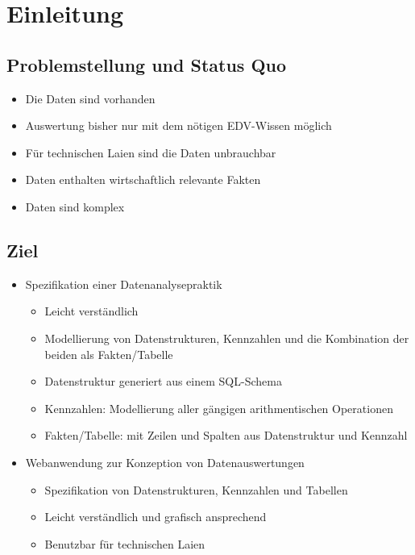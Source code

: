 \chapter{Einleitung}

\section{Problemstellung und Status Quo}
\begin{itemize}
  \item Die Daten sind vorhanden
  \item Auswertung bisher nur mit dem nötigen EDV-Wissen möglich
  \item Für technischen Laien sind die Daten unbrauchbar
  \item Daten enthalten wirtschaftlich relevante Fakten
  \item Daten sind komplex
\end{itemize}

\section{Ziel}
\begin{itemize}
\item Spezifikation einer Datenanalysepraktik
  \begin{itemize}
    \item Leicht verständlich
    \item Modellierung von Datenstrukturen, Kennzahlen und die Kombination der beiden als Fakten/Tabelle
    \item Datenstruktur generiert aus einem SQL-Schema
    \item Kennzahlen: Modellierung aller gängigen arithmentischen Operationen
    \item Fakten/Tabelle: mit Zeilen und Spalten aus Datenstruktur und Kennzahl 
  \end{itemize}
\item Webanwendung zur Konzeption von Datenauswertungen
  \begin{itemize}
    \item Spezifikation von Datenstrukturen, Kennzahlen und Tabellen
    \item Leicht verständlich und grafisch ansprechend
    \item Benutzbar für technischen Laien
  \end{itemize}
\end{itemize}
